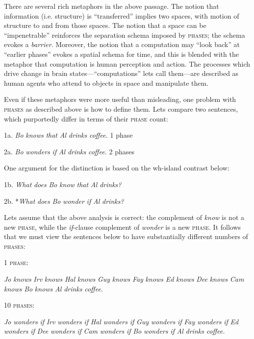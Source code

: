   There are several rich metaphors in the above passage. The notion that information (i.e. structure) is “transferred” implies two spaces, with motion of structure to and from those spaces. The notion that a space can be “impenetrable” reinforces the separation schema imposed by \textsc{phases}; the schema evokes a \textit{barrier}. Moreover, the notion that a computation may “look back” at “earlier phases” evokes a spatial schema for time, and this is blended with the metaphor that computation is human perception and action. The processes which drive change in brain states—“computations” lets call them—are described as human agents who attend to objects in space and manipulate them.

  Even if these metaphors were more useful than misleading, one problem with \textsc{phases} as described above is how to define them. Lets compare two sentences, which purportedly differ in terms of their \textsc{phase} count:

1a. \textit{Bo} \textit{knows} \textit{that} \textit{Al} \textit{drinks} \textit{coffee.}  1 phase

2a. \textit{Bo} \textit{wonders} \textit{if} \textit{Al} \textit{drinks} \textit{coffee.}  2 phases

One argument for the distinction is based on the wh-island contrast below:

  1b. \textit{What} \textit{does} \textit{Bo} \textit{know} \textit{that} \textit{Al} \textit{drinks?}

  2b. *\textit{What} \textit{does} \textit{Bo} \textit{wonder} \textit{if} \textit{Al} \textit{drinks?}

  Lets assume that the above analysis is correct: the complement of \textit{know} is not a new \textsc{phase}, while the \textit{if}{}-clause complement of \textit{wonder} is a new \textsc{phase}. It follows that we must view the sentences below to have substantially different numbers of \textsc{phases}:

1 \textsc{phase}:

\textit{Jo} \textit{knows} \textit{Irv} \textit{knows} \textit{Hal} \textit{knows} \textit{Guy} \textit{knows} \textit{Fay} \textit{knows} \textit{Ed} \textit{knows} \textit{Dee} \textit{knows} \textit{Cam} \textit{knows} \textit{Bo} \textit{knows} \textit{Al} \textit{drinks} \textit{coffee.}

10 \textsc{phases}:

\textit{Jo} \textit{wonders} \textit{if} \textit{Irv} \textit{wonders} \textit{if} \textit{Hal} \textit{wonders} \textit{if} \textit{Guy} \textit{wonders} \textit{if} \textit{Fay} \textit{wonders} \textit{if} \textit{Ed} \textit{wonders} \textit{if} \textit{Dee} \textit{wonders} \textit{if} \textit{Cam} \textit{wonders} \textit{if} \textit{Bo} \textit{wonders} \textit{if} \textit{Al} \textit{drinks} \textit{coffee.}

